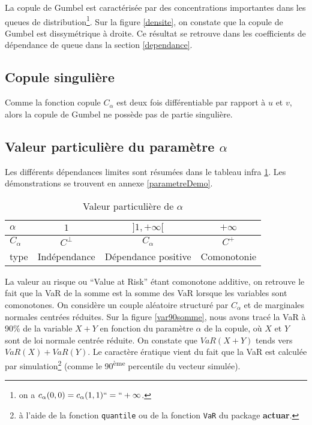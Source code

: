 \documentclass[11pt]{article}
\newcommand{\pkg}{\textbf}
\newcommand{\code}{\texttt}
\newcommand{\expo}{\textsuperscript}
\begin{document}
\medskip

La copule de Gumbel est caract\'eris\'ee par des concentrations importantes dans les queues de distribution\footnote{on a $c_\alpha(0,0)=c_\alpha(1,1)``=``+\infty$.}. 
Sur la figure \ref{densite}, on constate que la copule de Gumbel est dissym\'etrique \`a droite. Ce r\'esultat se retrouve dans les coefficients de
d\'ependance de queue dans la section \ref{dependance}. 



\subsection{Copule singuli\`ere}

Comme la fonction copule $C_\alpha$ est deux fois diff\'erentiable par rapport \`a $u$ et $v$, alors la copule de Gumbel ne poss\`ede pas de partie singuli\`ere.

\subsection{Valeur particuli\`ere du param\`etre $\alpha$}

Les diff\'erents d\'ependances limites sont r\'esum\'ees dans le tableau infra \ref{parametre}. 
Les d\'emonstrations se trouvent en annexe \ref{parametreDemo}.
\begin{table}[!htb]
\center
\begin{tabular}{lccc}
\hline
$\alpha$ & $1$ & $]1,+\infty[$ & $+\infty$\\
\hline
$C_\alpha$ & $C^\bot$ & $C_\alpha$ & $C^+$\\
\hline
type & Ind\'ependance & D\'ependance positive & Comonotonie\\
\hline
\end {tabular}
\caption{Valeur particuli\`ere de $\alpha$}
\label{parametre}
\end{table}

La valeur au risque ou ``Value at Risk'' \'etant comonotone additive, on retrouve le fait que la VaR de la somme
est la somme des VaR lorsque les variables sont comonotones. On consid\`ere un couple al\'eatoire structur\'e
par $C_\alpha$ et de marginales normales centr\'ees r\'eduites. Sur la figure \ref{var90somme}, nous avons trac\'e la VaR
\`a 90\% de la variable $X+Y$ en fonction du param\`etre $\alpha$ de la copule, o\`u $X$ et $Y$
sont de loi normale centr\'ee r\'eduite. On constate que $VaR(X+Y)$ tends
vers $VaR(X)+VaR(Y)$. Le caract\`ere \'eratique vient du fait que la VaR est calcul\'ee par simulation\footnote{\`a l'aide 
de la fonction \code{quantile} ou de la fonction \code{VaR} du package \pkg{actuar}. } (comme le 90\expo{\`eme}
percentile du vecteur simul\'ee).
\end{document}
